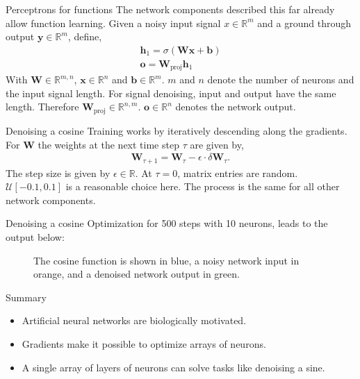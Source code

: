\documentclass{beamer}
\begin{document}
    \begin{frame}{Perceptrons for functions}
      The network components described this far already allow function learning.
      Given a noisy input signal $x \in \mathbb{R}^{m}$ and a ground through output $\mathbf{y} \in \mathbb{R}^m$,
      define,
      \begin{align}
        \mathbf{h}_1 = \sigma(\mathbf{W}\mathbf{x} + \mathbf{b}) \\
        \mathbf{o} = \mathbf{W}_{\text{proj}}\mathbf{h}_1
      \end{align}
      With $\mathbf{W} \in \mathbb{R}^{m,n}$, $\mathbf{x} \in \mathbb{R}^{n}$ and $\mathbf{b} \in \mathbb{R}^{m}$.
      $m$ and $n$ denote the number of neurons and the input signal length.
      For signal denoising, input and output have the same length.
      Therefore $\mathbf{W}_{\text{proj}} \in \mathbb{R}^{n,m}$.
      $\mathbf{o} \in \mathbb{R}^{n}$ denotes the network output.
    \end{frame}

    \begin{frame}{Denoising a cosine}
      Training works by iteratively descending along the gradients. For $\mathbf{W}$ the weights at the
      next time step $\tau$ are given by,
      \begin{align}
        \mathbf{W}_{\tau + 1} = \mathbf{W}_\tau - \epsilon \cdot \delta\mathbf{W}_{\tau}.
      \end{align}
      The step size is given by $\epsilon \in \mathbb{R}$. At $\tau = 0$, matrix entries are random.
      $\mathcal{U}[-0.1, 0.1]$ is a reasonable choice here.
      The process is the same for all other network components.
    \end{frame}

    \begin{frame}{Denoising a cosine}
      Optimization for 500 steps with 10 neurons, leads to the output below:
      \begin{figure}
        
        \caption{The cosine function is shown in blue, a noisy network input in orange, and a denoised network output in green.}
        \end{figure}
    \end{frame}

    \begin{frame}{Summary}
      \begin{itemize}
        \item Artificial neural networks are biologically motivated.
        \item Gradients make it possible to optimize arrays of neurons.
        \item A single array of layers of neurons can solve tasks like denoising a sine.
      \end{itemize}
    \end{frame}
\end{document}
